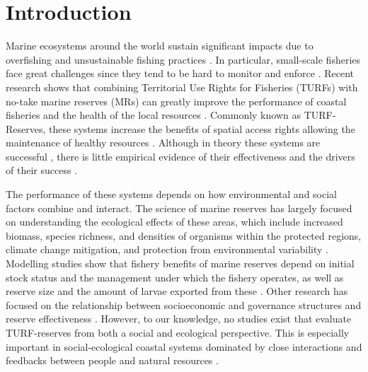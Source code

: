 \documentclass{frontiersSCNS}
\begin{document}
\hypertarget{introduction}{%
\section{Introduction}\label{introduction}}

Marine ecosystems around the world sustain significant impacts due to
overfishing and unsustainable fishing practices
\citep{halpern_2008-dK,worm_2006-IB,pauly_2005-qV}. In particular,
small-scale fisheries face great challenges since they tend to be hard
to monitor and enforce \citep{costello_2012}. Recent research shows that
combining Territorial Use Rights for Fisheries (TURFs) with no-take
marine reserves (MRs) can greatly improve the performance of coastal
fisheries and the health of the local resources
\citep{costello_2010-Ix,lester_2017}. Commonly known as TURF-Reserves,
these systems increase the benefits of spatial access rights allowing
the maintenance of healthy resources
\citep{afflerbach_2014-HP,lester_2017}. Although in theory these systems
are successful \citep{costello_2010-Ix,smallhornwest_2018}, there is
little empirical evidence of their effectiveness and the drivers of
their success \citep{afflerbach_2014-HP,lester_2017}.

The performance of these systems depends on how environmental and social
factors combine and interact. The science of marine reserves has largely
focused on understanding the ecological effects of these areas, which
include increased biomass, species richness, and densities of organisms
within the protected regions, climate change mitigation, and protection
from environmental variability
\citep{lester_2009-Ks,giakoumi_2017-V2,sala_2017-69,roberts_2017-J9,micheli_2012-EU}.
Modelling studies show that fishery benefits of marine reserves depend
on initial stock status and the management under which the fishery
operates, as well as reserve size and the amount of larvae exported from
these \citep{hilborn_2006,krueck_2017-J1,deleo_2015}. Other research has
focused on the relationship between socioeconomic and governance
structures and reserve effectiveness
\citep{halpern_2013,lpezangarita_2014,mascia_2017-m_}. However, to our
knowledge, no studies exist that evaluate TURF-reserves from both a
social and ecological perspective. This is especially important in
social-ecological coastal systems dominated by close interactions and
feedbacks between people and natural resources \citep{ostrom_2009-hg}.
\end{document}
